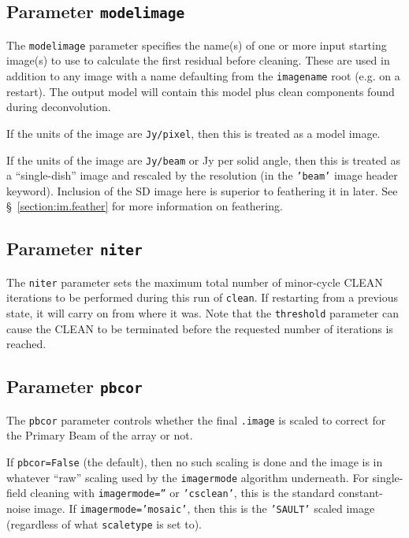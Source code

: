 \subsection{Parameter {\tt modelimage} }
\label{section:im.clean.modelimage}

The {\tt modelimage} parameter specifies the name(s) of one or more
input starting image(s) to use to calculate the first residual before
cleaning.  These are used in addition to any image with a name
defaulting from the {\tt imagename} root (e.g. on a restart).
The output model will contain this model plus
clean components found during deconvolution.  

If the units of the image are {\tt Jy/pixel}, then this is treated
as a model image.

If the units of the image are {\tt Jy/beam} or Jy per solid angle,
then this is treated as a ``single-dish'' image and rescaled by
the resolution (in the {\tt 'beam'} image header keyword). Inclusion
of the SD image here is superior to feathering it in later.
See \S~\ref{section:im.feather} for more information on feathering.

\subsection{Parameter {\tt niter} }
\label{section:im.clean.niter}

The {\tt niter} parameter sets the maximum total number of minor-cycle CLEAN
iterations to be performed during this run of {\tt clean}.  If restarting
from a previous state, it will carry on from where it was.  Note that
the {\tt threshold} parameter can cause the CLEAN to be terminated before
the requested number of iterations is reached.

\subsection{Parameter {\tt pbcor} }
\label{section:im.clean.pbcor}

The {\tt pbcor} parameter controls whether the final {\tt .image} 
is scaled to correct for the Primary Beam of the array or not.

If {\tt pbcor=False} (the default), then no such scaling is done
and the image is in whatever ``raw'' scaling used by the 
{\tt imagermode} algorithm underneath.  For single-field cleaning
with {\tt imagermode=''} or {\tt 'csclean'}, this is the standard
constant-noise image.  If {\tt imagermode='mosaic'}, then this is
the {\tt 'SAULT'} scaled image (regardless of what {\tt scaletype}
is set to).

